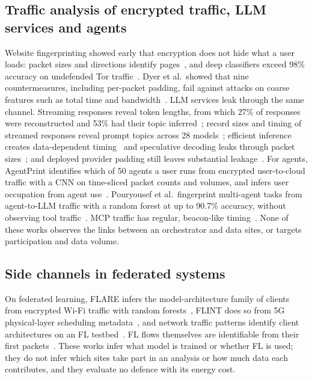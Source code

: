 \subsection{Traffic analysis of encrypted traffic, LLM services and agents}
Website fingerprinting showed early that encryption does not hide what a user loads: packet sizes and directions identify pages~\cite{panchenko2016website}, and deep classifiers exceed 98\% accuracy on undefended Tor traffic~\cite{sirinam2018deep}. Dyer et al.\ showed that nine countermeasures, including per-packet padding, fail against attacks on coarse features such as total time and bandwidth~\cite{dyer2012peekaboo}. LLM services leak through the same channel. Streaming responses reveal token lengths, from which 27\% of responses were reconstructed and 53\% had their topic inferred~\cite{weiss2024what}; record sizes and timing of streamed responses reveal prompt topics across 28 models~\cite{mcdonald2025whisper}; efficient inference creates data-dependent timing~\cite{carlini2024remote} and speculative decoding leaks through packet sizes~\cite{wei2024speculation}; and deployed provider padding still leaves substantial leakage~\cite{zhang2025netecho}. For agents, AgentPrint identifies which of 50 agents a user runs from encrypted user-to-cloud traffic with a CNN on time-sliced packet counts and volumes, and infers user occupation from agent use~\cite{zhang2025agentprint}. Pouryousef et al.\ fingerprint multi-agent tasks from agent-to-LLM traffic with a random forest at up to 90.7\% accuracy, without observing tool traffic~\cite{pouryousef2026benchmark}. MCP traffic has regular, beacon-like timing~\cite{sohail2026beacons}. None of these works observes the links between an orchestrator and data sites, or targets participation and data volume.

\subsection{Side channels in federated systems}
On federated learning, FLARE infers the model-architecture family of clients from encrypted Wi-Fi traffic with random forests~\cite{shuvo2025flare}, FLINT does so from 5G physical-layer scheduling metadata~\cite{shuvo2026flint}, and network traffic patterns identify client architectures on an FL testbed~\cite{shuvo2025fingerprinting}. FL flows themselves are identifiable from their first packets~\cite{boiano2024first}. These works infer what model is trained or whether FL is used; they do not infer which sites take part in an analysis or how much data each contributes, and they evaluate no defence with its energy cost.

